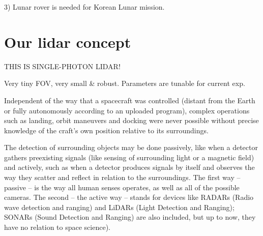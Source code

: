 \begin{figure}[H]
\begin{floatrow}


\end{floatrow}
\end{figure}



3) Lunar rover is needed for Korean Lunar mission.


\section{Our lidar concept}

THIS IS SINGLE-PHOTON LIDAR!




Very tiny FOV, very small \& robust.
Parameters are tunable for current exp. 

Independent of the way that a spacecraft was controlled (distant from the Earth or
fully autonomously according to an uploaded program), complex operations such as landing, orbit
maneuvers and docking were never possible without precise knowledge of the craft’s own position
relative to its surroundings.

The detection of surrounding objects may be done passively, like when a
detector gathers preexisting signals (like sensing of surrounding light or a magnetic field) and
actively, such as when a detector produces signals by itself and observes the way they scatter and
reflect in relation to the surroundings. The first way – passive – is the way all human senses
operates, as well as all of the possible cameras. The second – the active way – stands for devices like
RADARs (Radio wave detection and ranging) and LiDARs (Light Detection and Ranging); SONARs
(Sound Detection and Ranging) are also included, but up to now, they have no relation to space
science).

